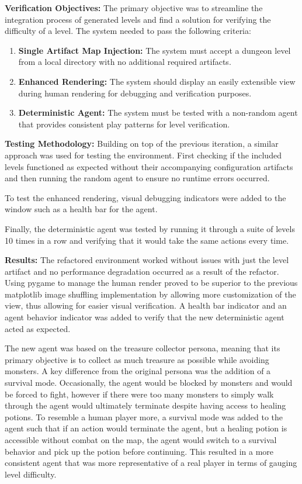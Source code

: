 \textbf{Verification Objectives:} The primary objective was to streamline the integration process of generated levels and find a solution for verifying
the difficulty of a level. The system needed to pass the following criteria:
\begin{enumerate}
	\item \textbf{Single Artifact Map Injection:} The system must accept a dungeon level from a local directory with no additional required artifacts.
	\item \textbf{Enhanced Rendering:} The system should display an easily extensible view during human rendering for debugging and verification purposes.
	\item \textbf{Deterministic Agent:} The system must be tested with a non-random agent that provides consistent play patterns for level verification.
\end{enumerate}

\textbf{Testing Methodology:} Building on top of the previous iteration, a similar approach was used for testing the environment. First checking if the
included levels functioned as expected without their accompanying configuration artifacts and then running the random agent to ensure no runtime errors occurred.

To test the enhanced rendering, visual debugging indicators were added to the window such as a health bar for the agent.

Finally, the deterministic agent was tested by running it through a suite of levels 10 times in a row and verifying that it would take the same actions every time.

\textbf{Results:} The refactored environment worked without issues with just the level artifact and no performance degradation occurred as a result of the refactor.
Using pygame to manage the human render proved to be superior to the previous matplotlib image shuffling implementation by allowing more customization of
the view, thus allowing for easier visual verification. A health bar indicator and an agent behavior indicator was added to verify that the new deterministic
agent acted as expected.

The new agent was based on the treasure collector persona, meaning that its primary objective is to collect as much treasure as possible while avoiding
monsters. A key difference from the original persona was the addition of a survival mode. Occasionally, the agent would be blocked by monsters and would be
forced to fight, however if there were too many monsters to simply walk through the agent would ultimately terminate despite having access to healing potions.
To resemble a human player more, a survival mode was added to the agent such that if an action would terminate the agent, but a healing potion is accessible without
combat on the map, the agent would switch to a survival behavior and pick up the potion before continuing. This resulted in a more consistent agent that 
was more representative of a real player in terms of gauging level difficulty.

